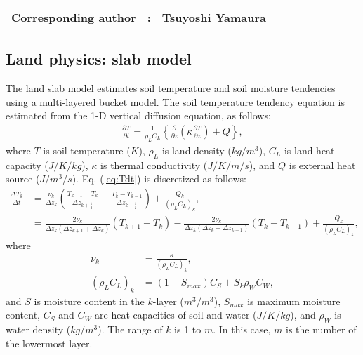 {\bf \Large
\begin{tabular}{ccc}
\hline
  Corresponding author & : & Tsuyoshi Yamaura\\
\hline
\end{tabular}
}


\subsection{Land physics: slab model}

The land slab model estimates soil temperature and soil moisture tendencies using a multi-layered bucket model.
The soil temperature tendency equation is estimated from the 1-D vertical diffusion equation, as follows:
\begin{align}
  \frac{\partial T}{\partial t} = \frac{1}{\rho_{L}C_{L}} \left\{ \frac{\partial}{\partial z} \left( \kappa \frac{\partial T}{\partial z} \right) + Q \right\},
  \label{eq:Tdt}
\end{align}
where $T$ is soil temperature ($K$), $\rho_{L}$ is land density ($kg/m^3$), $C_{L}$ is land heat capacity ($J/K/kg$), $\kappa$ is thermal conductivity ($J/K/m/s$), and $Q$ is external heat source ($J/m^3/s$).
Eq. (\ref{eq:Tdt}) is discretized as follows:
\begin{align}
  \frac{\Delta T_{k}}{\Delta t} &= \frac{\nu_{k}}{\Delta z_{k}} \left( \frac{T_{k+1}-T_{k}}{\Delta z_{k+\frac{1}{2}}} - \frac{T_{k}-T_{k-1}}{\Delta z_{k-\frac{1}{2}}} \right) + \frac{Q_{k}}{(\rho_{L}C_{L})_{k}}, \\
                                &= \frac{ 2\nu_{k} }{ \Delta z_{k} (\Delta z_{k+1}+\Delta z_{k}) }(T_{k+1}-T_{k}) - \frac{ 2\nu_{k} }{ \Delta z_{k} (\Delta z_{k}+\Delta z_{k-1}) }(T_{k}-T_{k-1}) +\frac{Q_{k}}{(\rho_{L}C_{L})_{k}},
\end{align}
where
\begin{align}
  \nu_{k} &= \frac{\kappa}{(\rho_{L}C_{L})_{k}}, \\
  (\rho_{L}C_{L})_{k} &= ( 1 - S_{max} ) C_{S} + S_{k} \rho_{W}C_{W},
\end{align}
and $S$ is moisture content in the $k$-layer ($m^3/m^3$), $S_{max}$ is maximum moisture content, $C_{S}$ and $C_{W}$ are heat capacities of soil and water ($J/K/kg$), and $\rho_{W}$ is water density ($kg/m^3$).
The range of $k$ is 1 to $m$.
In this case, $m$ is the number of the lowermost layer.
